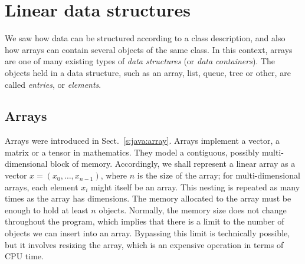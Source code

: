 \documentclass[a4paper]{book}
\theoremstyle{changebreak}                %
\begin{document}

\chapter{Linear data structures}
\label{c:linear}

\begin{center}
\end{center}

We saw how data can be structured according to a
class description, and also how arrays can
contain several objects of the same class. In this
context, arrays are one of many existing types of {\it data
  structures} (or {\it data
  containers}). The objects held in a data
structure, such as an array, list, queue, tree or other, are called
{\it entries}, or {\it
  elements}.

\section{Arrays}
\label{s:linear:array}
Arrays were introduced in
Sect.~\ref{s:java:array}. Arrays implement a vector, 
a matrix or a tensor in mathematics. They
model a contiguous, possibly
multi-dimensional block of
memory. Accordingly, we shall represent a linear
array as a vector $x=(x_0,\ldots,x_{n-1})$, where
$n$ is the size of the array; for multi-dimensional arrays, each
element $x_i$ might itself be an array. This nesting is repeated as
many times as the array has dimensions. The memory allocated to the
array must be enough to hold at least $n$ objects. Normally, the
memory size does not change throughout the program, which implies that
there is a limit to the number of objects we can insert into an
array. Bypassing this limit is technically possible, but it involves
resizing the array, which is an expensive operation in terms of CPU time.
\end{document}
